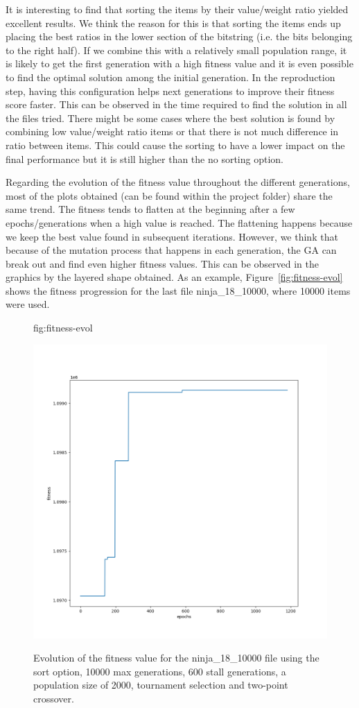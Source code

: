 \documentclass[anon]{CI}
\begin{document}
It is interesting to find that sorting the items by their value/weight ratio yielded excellent results. We think the reason for this is that sorting the items ends up placing the best ratios in the lower section of the bitstring (i.e. the bits belonging to the right half). If we combine this with a relatively small population range, it is likely to get the first generation with a high fitness value and it is even possible to find the optimal solution among the initial generation. In the reproduction step, having this configuration helps next generations to improve their fitness score faster. This can be observed in the time required to find the solution in all the files tried. There might be some cases where the best solution is found by combining low value/weight ratio items or that there is not much difference in ratio between items. This could cause the sorting to have a lower impact on the final performance but it is still higher than the no sorting option.

Regarding the evolution of the fitness value throughout the different generations, most of the plots obtained (can be found within the project folder) share the same trend. The fitness tends to flatten at the beginning after a few epochs/generations when a high value is reached. The flattening happens because we keep the best value found in subsequent iterations. However, we think that because of the mutation process that happens in each generation, the GA can break out and find even higher fitness values. This can be observed in the graphics by the layered shape obtained. As an example, Figure~\ref{fig:fitness-evol} shows the fitness progression for the last file ninja\_18\_10000, where 10000 items were used.

\begin{figure}[htbp]
\floatconts
{fig:fitness-evol}
{\caption{Evolution of the fitness value for the ninja\_18\_10000 file using the sort option, 10000 max generations, 600 stall generations, a population
    size of 2000, tournament selection and two-point
    crossover.}}
{\includegraphics[width=.6\textwidth]{images/ninja_18_10000}}
\end{figure}
\end{document}
